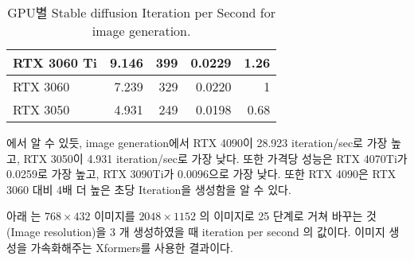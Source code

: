 \begin{table}[]
{\begin{tabular}{|l|r|r|r|r|}
RTX 3060 Ti   & 9.146                              & 399                                & 0.0229                                                                                                               & 1.26                                                                                                             \\ \hline
RTX 3060      & 7.239                              & 329                                & 0.0220                                                                                                               & 1                                                                                                                \\ \hline
RTX 3050      & 4.931                              & 249                                & 0.0198                                                                                                               & 0.68                                                                                                             \\ \hline
\end{tabular}%
}
\caption{\label{stablegpubenchmarktable}GPU별 Stable diffusion Iteration per Second for image generation.}
\end{table}

\tableautorefname{\ref{stablegpubenchmarktable}}에서 알 수 있듯, image generation에서 RTX 4090이 28.923 iteration/sec로 가장 높고, RTX 3050이 4.931 iteration/sec로 가장 낮다. 또한 가격당 성능은 RTX 4070Ti가 0.0259로 가장 높고, RTX 3090Ti가 0.0096으로 가장 낮다. 또한 RTX 4090은 RTX 3060 대비 4배 더 높은 초당 Iteration을 생성함을 알 수 있다.

아래 \tableautorefname{\ref{stableresolutiongpubenchmarktable}}\cite{jarred2023stable}는 $768\times 432$ 이미지를 $2048\times 1152$ 의 이미지로 25 단계로 거쳐
바꾸는 것(Image resolution)을 3 개 생성하였을 때 iteration per second 의 값이다. 이미지
생성을 가속화해주는 Xformers\cite{xFormers2022}를 사용한 결과이다.

